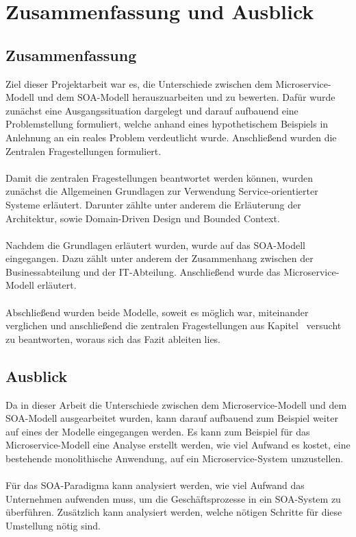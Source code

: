 \chapter{Zusammenfassung und Ausblick}
\label{chap:ZusammenfassungUndAusblick}

\section{Zusammenfassung}
\label{sec:Zusammenfassung}
Ziel dieser Projektarbeit war es, die Unterschiede zwischen dem Microservice-Modell und dem SOA-Modell herauszuarbeiten und zu bewerten. Dafür wurde zunächst eine Ausgangssituation dargelegt und darauf aufbauend eine Problemstellung formuliert, welche anhand eines hypothetischem Beispiels in Anlehnung an ein reales Problem verdeutlicht wurde. Anschließend wurden die Zentralen Fragestellungen formuliert.
\\\\
Damit die zentralen Fragestellungen beantwortet werden können, wurden zunächst die Allgemeinen Grundlagen zur Verwendung Service-orientierter Systeme erläutert. Darunter zählte unter anderem die Erläuterung der Architektur, sowie Domain-Driven Design und Bounded Context.
\\\\
Nachdem die Grundlagen erläutert wurden, wurde auf das SOA-Modell eingegangen. Dazu zählt unter anderem der Zusammenhang zwischen der Businessabteilung und der IT-Abteilung. Anschließend wurde das Microservice-Modell erläutert.
\\\\
Abschließend wurden beide Modelle, soweit es möglich war, miteinander verglichen und anschließend die zentralen Fragestellungen aus Kapitel \ versucht zu beantworten, woraus sich das Fazit ableiten lies.

\section{Ausblick}
\label{sec:Ausblick}
Da in dieser Arbeit die Unterschiede zwischen dem Microservice-Modell und dem SOA-Modell ausgearbeitet wurden, kann darauf aufbauend zum Beispiel weiter auf eines der Modelle eingegangen werden. Es kann zum Beispiel für das Microservice-Modell eine Analyse erstellt werden, wie viel Aufwand es kostet, eine bestehende monolithische Anwendung, auf ein Microservice-System umzustellen.
\\\\
Für das SOA-Paradigma kann analysiert werden, wie viel Aufwand das Unternehmen aufwenden muss, um die Geschäftsprozesse in ein SOA-System zu überführen. Zusätzlich kann analysiert werden, welche nötigen Schritte für diese Umstellung nötig sind.